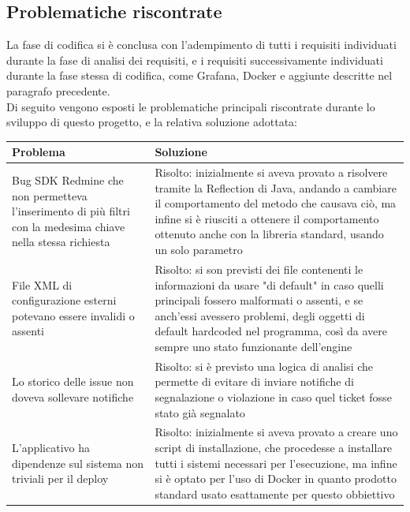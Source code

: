 	\subsection{Problematiche riscontrate}
		La fase di codifica si è conclusa con l'adempimento di tutti i requisiti individuati durante la fase di analisi dei requisiti, e i requisiti successivamente individuati durante la fase stessa di codifica, come Grafana, Docker e aggiunte descritte nel paragrafo precedente.\\
		Di seguito vengono esposti le problematiche principali riscontrate durante lo sviluppo di questo progetto, e la relativa soluzione adottata:
		 \begin{center}
			\begin{longtable}{|p{7cm}|p{7cm}|}
				\hline
				\rowcolor{lighter-grayer}
				\textbf{Problema} & \textbf{Soluzione} \\
				\hline
				\endfirsthead
				Bug SDK Redmine che non permetteva l'inserimento di più filtri con la medesima chiave nella stessa richiesta & Risolto: inizialmente si aveva provato a risolvere tramite la Reflection di Java, andando a cambiare il comportamento del metodo che causava ciò, ma infine si è riusciti a ottenere il comportamento ottenuto anche con la libreria standard, usando un solo parametro\\ \hline
				File XML di configurazione esterni potevano essere invalidi o assenti & Risolto: si son previsti dei file contenenti le informazioni da usare "di default" in caso quelli principali fossero malformati o assenti, e se anch'essi avessero problemi, degli oggetti di default hardcoded nel programma, così da avere sempre uno stato funzionante dell'engine\\ \hline
				Lo storico delle issue non doveva sollevare notifiche & Risolto: si è previsto una logica di analisi che permette di evitare di inviare notifiche di segnalazione o violazione in caso quel ticket fosse stato già segnalato \\ \hline
				L'applicativo ha dipendenze sul sistema non triviali per il deploy & Risolto: inizialmente si aveva provato a creare uno script di installazione, che procedesse a installare tutti i sistemi necessari per l'esecuzione, ma infine si è optato per l'uso di Docker in quanto prodotto standard usato esattamente per questo obbiettivo \\ \hline
			\end{longtable}
		\end{center}